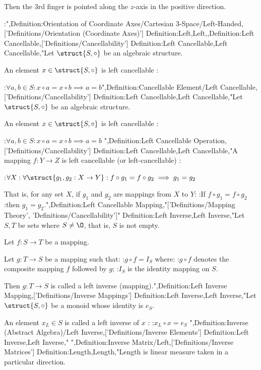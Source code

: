 Then the $3$rd finger is pointed along the $z$-axis in the positive direction.


:",Definition:Orientation of Coordinate Axes/Cartesian 3-Space/Left-Handed,['Definitions/Orientation (Coordinate Axes)']
Definition:Left,Left,,Definition:Left Cancellable,['Definitions/Cancellability']
Definition:Left Cancellable,Left Cancellable,"Let $\struct {S, \circ}$ be an algebraic structure.


An element $x \in \struct {S, \circ}$ is left cancellable :

:$\forall a, b \in S: x \circ a = x \circ b \implies a = b$",Definition:Cancellable Element/Left Cancellable,['Definitions/Cancellability']
Definition:Left Cancellable,Left Cancellable,"Let $\struct {S, \circ}$ be an algebraic structure.


An element $x \in \struct {S, \circ}$ is left cancellable :

:$\forall a, b \in S: x \circ a = x \circ b \implies a = b$
",Definition:Left Cancellable Operation,['Definitions/Cancellability']
Definition:Left Cancellable,Left Cancellable,"A mapping $f: Y \to Z$ is left cancellable (or left-cancellable) :

:$\forall X: \forall \struct {g_1, g_2: X \to Y}: f \circ g_1 = f \circ g_2 \implies g_1 = g_2$

That is, for any set $X$, if $g_1$ and $g_2$ are mappings from $X$ to $Y$:
:If $f \circ g_1 = f \circ g_2$
:then $g_1 = g_2$.",Definition:Left Cancellable Mapping,"['Definitions/Mapping Theory', 'Definitions/Cancellability']"
Definition:Left Inverse,Left Inverse,"Let $S, T$ be sets where $S \ne \O$, that is, $S$ is not empty.

Let $f: S \to T$ be a mapping.


Let $g: T \to S$ be a mapping such that:
:$g \circ f = I_S$
where:
:$g \circ f$ denotes the composite mapping $f$ followed by $g$;
:$I_S$ is the identity mapping on $S$.


Then $g: T \to S$ is called a left inverse (mapping).",Definition:Left Inverse Mapping,['Definitions/Inverse Mappings']
Definition:Left Inverse,Left Inverse,"Let $\struct {S, \circ}$ be a monoid whose identity is $e_S$.

An element $x_L \in S$ is called a left inverse of $x$ :
:$x_L \circ x = e_S$
",Definition:Inverse (Abstract Algebra)/Left Inverse,['Definitions/Inverse Elements']
Definition:Left Inverse,Left Inverse,"
",Definition:Inverse Matrix/Left,['Definitions/Inverse Matrices']
Definition:Length,Length,"Length is linear measure taken in a particular direction.

